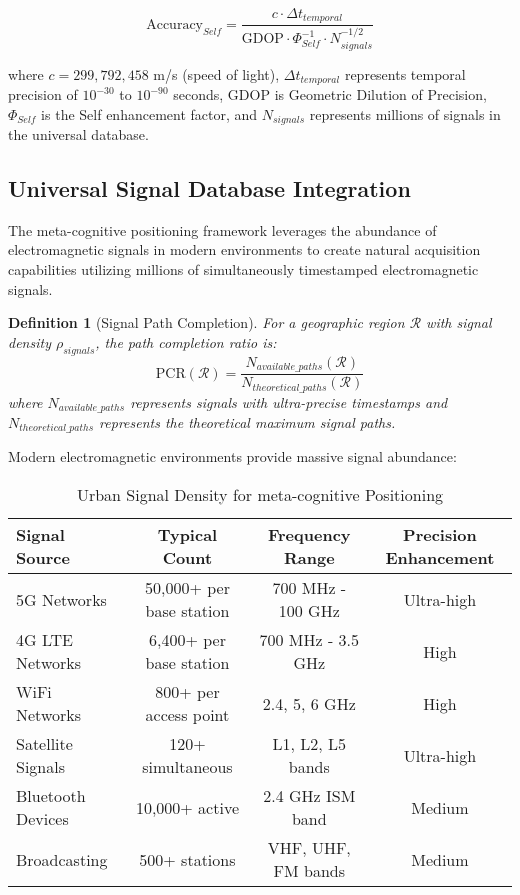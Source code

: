 \documentclass[12pt,a4paper]{article}
\newtheorem{definition}[theorem]{Definition}
\begin{document}
\begin{equation}
\text{Accuracy}_{Self} = \frac{c \cdot \Delta t_{temporal}}{\text{GDOP} \cdot \Phi_{Self}^{-1} \cdot N_{signals}^{-1/2}}
\end{equation}

where $c = 299,792,458$ m/s (speed of light), $\Delta t_{temporal}$ represents temporal precision of $10^{-30}$ to $10^{-90}$ seconds, $\text{GDOP}$ is Geometric Dilution of Precision, $\Phi_{Self}$ is the Self enhancement factor, and $N_{signals}$ represents millions of signals in the universal database.

\subsection{Universal Signal Database Integration}

The meta-cognitive positioning framework leverages the abundance of electromagnetic signals in modern environments to create natural acquisition capabilities utilizing millions of simultaneously timestamped electromagnetic signals.

\begin{definition}[Signal Path Completion]
For a geographic region $\mathcal{R}$ with signal density $\rho_{signals}$, the path completion ratio is:
\begin{equation}
\text{PCR}(\mathcal{R}) = \frac{N_{available\_paths}(\mathcal{R})}{N_{theoretical\_paths}(\mathcal{R})}
\end{equation}
where $N_{available\_paths}$ represents signals with ultra-precise timestamps and $N_{theoretical\_paths}$ represents the theoretical maximum signal paths.
\end{definition}

Modern electromagnetic environments provide massive signal abundance:

\begin{table}[H]
\centering
\caption{Urban Signal Density for meta-cognitive Positioning}
\begin{tabular}{@{}lccc@{}}
\toprule
\textbf{Signal Source} & \textbf{Typical Count} & \textbf{Frequency Range} & \textbf{Precision Enhancement} \\
\midrule
5G Networks & 50,000+ per base station & 700 MHz - 100 GHz & Ultra-high \\
4G LTE Networks & 6,400+ per base station & 700 MHz - 3.5 GHz & High \\
WiFi Networks & 800+ per access point & 2.4, 5, 6 GHz & High \\
Satellite Signals & 120+ simultaneous & L1, L2, L5 bands & Ultra-high \\
Bluetooth Devices & 10,000+ active & 2.4 GHz ISM band & Medium \\
Broadcasting & 500+ stations & VHF, UHF, FM bands & Medium \\
\bottomrule
\end{tabular}
\end{table}
\end{document}
